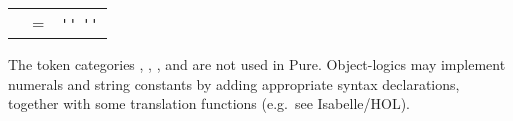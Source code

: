 \begin{isabellebody}
\begin{isamarkuptext}
\begin{center}
\begin{supertabular}{rcl}
    \hypertarget{syntax.inner.xstr}{\hyperlink{syntax.inner.xstr}{\mbox{}}} & = & \verb|''| \isa{{\isachardoublequote}{\isasymdots}{\isachardoublequote}} \verb|''| \\
  \end{supertabular}
  \end{center}

  The token categories \hyperlink{syntax.inner.num}{\mbox{}}, \hyperlink{syntax.inner.float-token}{\mbox{}}, \hyperlink{syntax.inner.xnum}{\mbox{}}, and \hyperlink{syntax.inner.xstr}{\mbox{}} are
  not used in Pure.  Object-logics may implement numerals and string
  constants by adding appropriate syntax declarations, together with
  some translation functions (e.g.\ see Isabelle/HOL).


\end{isamarkuptext}
\end{isabellebody}
